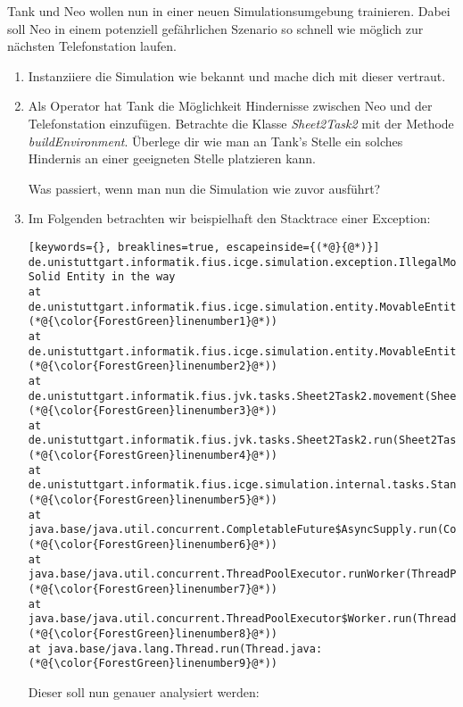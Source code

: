 Tank und Neo wollen nun in einer neuen Simulationsumgebung trainieren. 
Dabei soll Neo in einem potenziell gefährlichen Szenario so schnell wie möglich zur nächsten Telefonstation laufen.
\begin{enumerate}[label=\alph*)]
    \item Instanziiere die Simulation wie bekannt und mache dich mit dieser vertraut.
    \item Als Operator hat Tank die Möglichkeit Hindernisse zwischen Neo und der Telefonstation einzufügen.
    Betrachte die Klasse \textit{Sheet2Task2} mit der Methode \textit{buildEnvironment}. Überlege dir wie man an Tank's Stelle 
    ein solches Hindernis an einer geeigneten Stelle platzieren kann.\par
    Was passiert, wenn man nun die Simulation wie zuvor ausführt?
    \item Im Folgenden betrachten wir beispielhaft den Stacktrace einer Exception:
    \begin{lstlisting}[keywords={}, breaklines=true, escapeinside={(*@}{@*)}]
de.unistuttgart.informatik.fius.icge.simulation.exception.IllegalMoveException: Solid Entity in the way
at de.unistuttgart.informatik.fius.icge.simulation.entity.MovableEntity.internalMove(MovableEntity.java:(*@{\color{ForestGreen}linenumber1}@*))
at de.unistuttgart.informatik.fius.icge.simulation.entity.MovableEntity.move(MovableEntity.java:(*@{\color{ForestGreen}linenumber2}@*))
at de.unistuttgart.informatik.fius.jvk.tasks.Sheet2Task2.movement(Sheet2Task2.java:(*@{\color{ForestGreen}linenumber3}@*))
at de.unistuttgart.informatik.fius.jvk.tasks.Sheet2Task2.run(Sheet2Task2.java:(*@{\color{ForestGreen}linenumber4}@*))
at de.unistuttgart.informatik.fius.icge.simulation.internal.tasks.StandardTaskRunner.executeTask(StandardTaskRunner.java:(*@{\color{ForestGreen}linenumber5}@*))
at java.base/java.util.concurrent.CompletableFuture$AsyncSupply.run(CompletableFuture.java:(*@{\color{ForestGreen}linenumber6}@*))
at java.base/java.util.concurrent.ThreadPoolExecutor.runWorker(ThreadPoolExecutor.java:(*@{\color{ForestGreen}linenumber7}@*))
at java.base/java.util.concurrent.ThreadPoolExecutor$Worker.run(ThreadPoolExecutor.java:(*@{\color{ForestGreen}linenumber8}@*))
at java.base/java.lang.Thread.run(Thread.java:(*@{\color{ForestGreen}linenumber9}@*))
    \end{lstlisting}
    Dieser soll nun genauer analysiert werden:
    \begin{enumerate}

\end{enumerate}
\end{enumerate}
